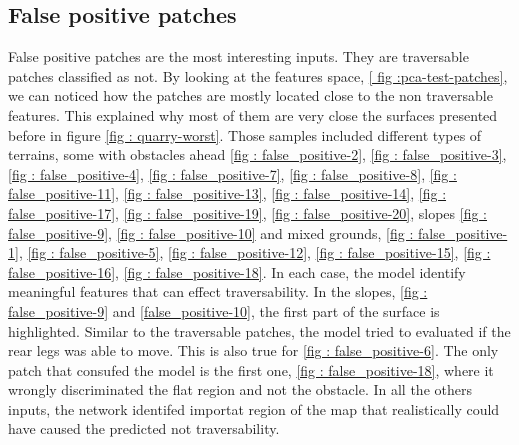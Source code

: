 \documentclass[../document.tex]{subfiles}
\begin{document}
\subsection{False positive patches}
False positive patches are the most interesting inputs. They are traversable patches classified as not. By looking at the features space, \ref{ fig :pca-test-patches}, we can noticed how the patches are mostly located close to the non traversable features. This explained why most of them are very close the surfaces presented before in figure \ref{fig : quarry-worst}. Those samples included different types of terrains, some with obstacles ahead \ref{fig : false_positive-2}, \ref{fig : false_positive-3}, \ref{fig : false_positive-4}, \ref{fig : false_positive-7}, \ref{fig : false_positive-8}, \ref{fig : false_positive-11}, \ref{fig : false_positive-13}, \ref{fig : false_positive-14}, \ref{fig : false_positive-17}, \ref{fig : false_positive-19}, \ref{fig : false_positive-20}, slopes \ref{fig : false_positive-9}, \ref{fig : false_positive-10} and mixed grounds, \ref{fig : false_positive-1}, \ref{fig : false_positive-5}, \ref{fig : false_positive-12}, \ref{fig : false_positive-15}, \ref{fig : false_positive-16}, \ref{fig : false_positive-18}. In each case, the model identify meaningful features that can effect traversability. In the slopes, \ref{fig : false_positive-9} and \ref{false_positive-10}, the first part of the surface is highlighted. Similar to the traversable patches, the model tried to evaluated if the rear legs was able to move. This is also true for   \ref{fig : false_positive-6}. The only patch that consufed the model is the first one, \ref{fig : false_positive-18}, where it wrongly discriminated the flat region and not the obstacle. In all the others inputs, the network identifed importat region of the map that realistically could have caused the predicted not traversability.
\end{document}
